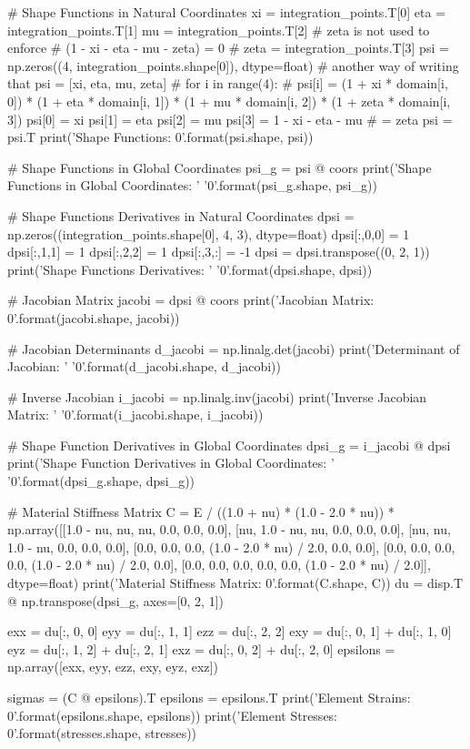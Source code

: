 \begin{python}
    # Shape Functions in Natural Coordinates
    xi = integration_points.T[0]
    eta = integration_points.T[1]
    mu = integration_points.T[2]
    # zeta is not used to enforce
    # (1 - xi - eta - mu - zeta) = 0
    # zeta = integration_points.T[3]
    psi = np.zeros((4, integration_points.shape[0]), dtype=float)
    # another way of writing that psi = [xi, eta, mu, zeta]
    # for i in range(4):
    #     psi[i] = (1 + xi * domain[i, 0]) * (1 + eta * domain[i, 1]) * (1 + mu * domain[i, 2]) * (1 + zeta * domain[i, 3])
    psi[0] = xi
    psi[1] = eta
    psi[2] = mu
    psi[3] = 1 - xi - eta - mu  # = zeta
    psi = psi.T
    print('Shape Functions: {0}'.format(psi.shape, psi))

    # Shape Functions in Global Coordinates
    psi_g = psi @ coors
    print('Shape Functions in Global Coordinates: '
          '{0}'.format(psi_g.shape, psi_g))

    # Shape Functions Derivatives in Natural Coordinates
    dpsi = np.zeros((integration_points.shape[0], 4, 3), dtype=float)
    dpsi[:,0,0] = 1
    dpsi[:,1,1] = 1
    dpsi[:,2,2] = 1
    dpsi[:,3,:] = -1
    dpsi = dpsi.transpose((0, 2, 1))
    print('Shape Functions Derivatives: '
          '{0}'.format(dpsi.shape, dpsi))

    # Jacobian Matrix
    jacobi = dpsi @ coors
    print('Jacobian Matrix: {0}'.format(jacobi.shape, jacobi))

    # Jacobian Determinants
    d_jacobi = np.linalg.det(jacobi)
    print('Determinant of Jacobian: '
          '{0}'.format(d_jacobi.shape, d_jacobi))

    # Inverse Jacobian
    i_jacobi = np.linalg.inv(jacobi)
    print('Inverse Jacobian Matrix: '
          '{0}'.format(i_jacobi.shape, i_jacobi))

    # Shape Function Derivatives in Global Coordinates
    dpsi_g = i_jacobi @ dpsi
    print('Shape Function Derivatives in Global Coordinates: '
          '{0}'.format(dpsi_g.shape, dpsi_g))

    # Material Stiffness Matrix
    C = E / ((1.0 + nu) * (1.0 - 2.0 * nu)) *
        np.array([[1.0 - nu, nu, nu, 0.0, 0.0, 0.0],
                  [nu, 1.0 - nu, nu, 0.0, 0.0, 0.0],
                  [nu, nu, 1.0 - nu, 0.0, 0.0, 0.0],
                  [0.0, 0.0, 0.0, (1.0 - 2.0 * nu) / 2.0, 0.0, 0.0],
                  [0.0, 0.0, 0.0, 0.0, (1.0 - 2.0 * nu) / 2.0, 0.0],
                  [0.0, 0.0, 0.0, 0.0, 0.0, (1.0 - 2.0 * nu) / 2.0]],
                  dtype=float)
    print('Material Stiffness Matrix: {0}'.format(C.shape, C))
    du = disp.T @ np.transpose(dpsi_g, axes=[0, 2, 1])

    exx = du[:, 0, 0]
    eyy = du[:, 1, 1]
    ezz = du[:, 2, 2]
    exy = du[:, 0, 1] + du[:, 1, 0]
    eyz = du[:, 1, 2] + du[:, 2, 1]
    exz = du[:, 0, 2] + du[:, 2, 0]
    epsilons = np.array([exx, eyy, ezz, exy, eyz, exz])

    sigmas = (C @ epsilons).T
    epsilons = epsilons.T
    print('Element Strains: {0}'.format(epsilons.shape, epsilons))
    print('Element Stresses: {0}'.format(stresses.shape, stresses))
\end{python}



